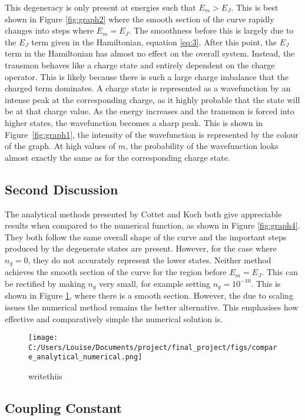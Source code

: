 \documentclass[11pt]{article}
\begin{document}
This degeneracy is only present at energies such that $E_m > E_J$. This is best shown in Figure \ref{fig:graph2} where the smooth section of the curve rapidly changes into steps where $E_m = E_J$. The smoothness before this is largely due to the $E_J$ term given in the Hamiltonian, equation \ref{eq:3}. After this point, the $E_J$ term in the Hamiltonian has almost no effect on the overall system. Instead, the transmon behaves like a charge state and entirely dependent on the charge operator. This is likely because there is such a large charge imbalance that the charged term dominates. A charge state is represented as a wavefunction by an intense peak at the corresponding charge, as it highly probable that the state will be at that charge value. As the energy increases and the transmon is forced into higher states, the wavefunction becomes a sharp peak. This is shown in Figure~\ref{fig:graph1}, the intensity of the wavefunction is represented by the colour of the graph. At high values of $m$, the probability of the wavefunction looks almost exactly the same as for the corresponding charge state.

\subsection{Second Discussion}
The analytical methods presented by Cottet and Koch both give appreciable results when compared to the numerical function, as shown in Figure \ref{fig:graph4}. They both follow the same overall shape of the curve and the important steps produced by the degenerate states are present. However, for the case where $n_g = 0$, they do not accurately represent the lower states. Neither method achieves the smooth section of the curve for the region before $E_m = E_J$. This can be rectified by making $n_g$ very small, for example setting $n_g = 10^{-10}$. This is shown in Figure \ref{fig:graph6}, where there is a smooth section. However, the due to scaling issues the numerical method remains the better alternative. This emphasises how effective and comparatively simple the numerical solution is.

\begin{figure}[ht]
\centering
\texttt{[image: C:/Users/Louise/Documents/project/final\_project/figs/compare\_analytical\_numerical.png]}
\caption{writethiis}
\label{fig:graph6}
\end{figure}



\subsection{Coupling Constant}
\end{document}
